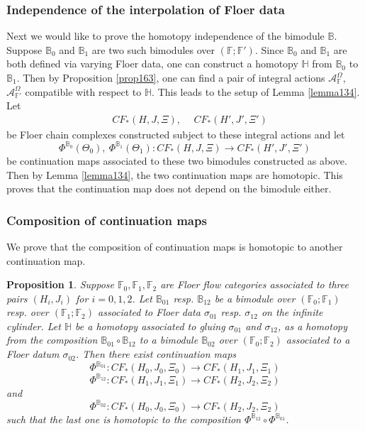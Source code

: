 \documentclass[reqno, 10pt]{amsart}
\numberwithin{equation}{section}
\numberwithin{equation}{section}
\newtheorem{prop}[thm]{Proposition}
\theoremstyle{definition}
\theoremstyle{remark}
\newcommand{\beqn}{\begin{equation*}}
\newcommand{\eeqn}{\end{equation*}}
\newcommand{\mb}{\mathbb}
\newcommand{\mc}{\mathcal}
\begin{document}
\subsubsection{Independence of the interpolation of Floer data}

Next we would like to prove the homotopy independence of the bimodule ${\mb B}$. Suppose ${\mb B}_0$ and ${\mb B}_1$ are two such bimodules over $({\mb F}; {\mb F}')$. Since ${\mb B}_0$ and ${\mb B}_1$ are both defined via varying Floer data, one can construct a homotopy ${\mb H}$ from ${\mb B}_0$ to ${\mb B}_1$. Then by Proposition \ref{prop163}, one can find a pair of integral actions ${\mc A}_{{\mb F}}^\Omega$, ${\mc A}_{{\mb F}'}^{\Omega}$ compatible with respect to ${\mb H}$. This leads to the setup of Lemma \ref{lemma134}. Let 
\begin{align*}
&\ CF_*(H, J, \Xi),\ &\ CF_*(H', J', \Xi')
\end{align*}
be Floer chain complexes constructed subject to these integral actions and let 
\beqn
\Phi^{{\mb B}_0}(\Theta_0),\ \Phi^{{\mb B}_1}(\Theta_1): CF_*(H, J, \Xi) \to CF_*(H', J', \Xi')
\eeqn
be continuation maps associated to these two bimodules constructed as above. Then by Lemma \ref{lemma134}, the two continuation maps are homotopic. This proves that the continuation map does not depend on the bimodule either. 

\subsubsection{Composition of continuation maps}

We prove that the composition of continuation maps is homotopic to another continuation map. 


\begin{prop}\label{prop134}
Suppose ${\mb F}_0, {\mb F}_1, {\mb F}_2$ are Floer flow categories associated to three pairs $(H_i, J_i)$ for $i = 0, 1, 2$. Let ${\mb B}_{01}$ resp. ${\mb B}_{12}$ be a bimodule over $({\mb F}_0; {\mb F}_1)$ resp. over $({\mb F}_1; {\mb F}_2)$ associated to Floer data $\sigma_{01}$ resp. $\sigma_{12}$ on the infinite cylinder. Let ${\mb H}$ be a homotopy associated to gluing $\sigma_{01}$ and $\sigma_{12}$, as a homotopy from the composition ${\mb B}_{01}\circ {\mb B}_{12}$ to a bimodule ${\mb B}_{02}$ over $({\mb F}_0; {\mb F}_2)$ associated to a Floer datum $\sigma_{02}$. Then there exist continuation maps
\beqn
\Phi^{{\mb B}_{01}}: CF_*(H_0, J_0, \Xi_0) \to CF_*(H_1, J_1, \Xi_1)
\eeqn
\beqn
\Phi^{{\mb B}_{12}}: CF_*(H_1, J_1, \Xi_1) \to CF_*(H_2, J_2, \Xi_2)
\eeqn
and 
\beqn
\Phi^{\mb{B}_{02}}: CF_*(H_0, J_0, \Xi_0) \to CF_*(H_2, J_2, \Xi_2)
\eeqn
such that the last one is homotopic to the composition $\Phi^{{\mb B}_{12}} \circ \Phi^{\mb{B}_{01}}$.
\end{prop}
\end{document}
